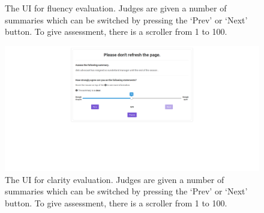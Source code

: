 \documentclass[11pt,a4paper]{article}
\begin{document}
\begin{figure}[h]
    \centering
    \caption{The UI for fluency evaluation. Judges are given a number of summaries which can be switched by pressing the `Prev' or `Next' button. To give assessment, there is a scroller from 1 to 100.}
    \label{fig:my_label}
\end{figure}
\begin{figure}[h]
    \centering
    \includegraphics[width=17cm]{clarity}
    \caption{The UI for clarity evaluation. Judges are given a number of summaries which can be switched by pressing the `Prev' or `Next' button. To give assessment, there is a scroller from 1 to 100.}
    \label{fig:my_label}
\end{figure}
\end{document}

